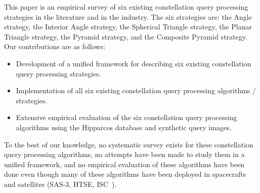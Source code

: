This paper is an empirical survey of six existing constellation query processing strategies in the literature and in
the industry.
The six strategies are: the Angle strategy, the Interior Angle strategy, the Spherical Triangle strategy,
the Planar Triangle strategy, the Pyramid strategy, and the Composite Pyramid strategy.
Our contributions are as follows:
\begin{itemize}
    \item Development of a unified framework for describing six existing constellation query processing strategies.
    \item Implementation of all six existing constellation query processing algorithms / strategies.
    \item Extensive empirical evaluation of the six constellation query processing algorithms using the
        Hipparcos database and synthetic query images.
\end{itemize}
To the best of our knowledge, no systematic survey exists for these constellation query processing algorithms,
no attempts have been made to study them in a unified framework, and no empirical evaluation of these algorithms have
been done even though many of these algorithms have been deployed in spacecrafts and satellites
(SAS-3, HTSE, ISC~\cite{gottlieb:spacecraftAttitudeDetermination,mortari:pyramidIdentification}).


